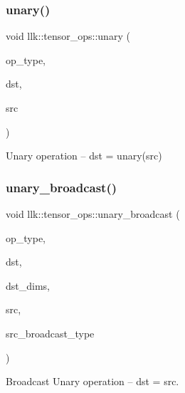 \subsubsection{\texorpdfstring{unary()}{unary()}}
{\footnotesize\ttfamily void llk\+::tensor\+\_\+ops\+::unary (\begin{DoxyParamCaption}\item[{\hyperlink{namespacellk_1_1tensor__ops_a5fae70cbcf6cd7aadca4a04278614633}{unary\+\_\+op}}]{op\+\_\+type,  }\item[{\hyperlink{classllk_1_1Tensor}{llk\+::\+Tensor} \&}]{dst,  }\item[{\hyperlink{classllk_1_1Tensor}{llk\+::\+Tensor} \&}]{src }\end{DoxyParamCaption})}



Unary operation -- dst = unary(src) 

\mbox{\label{namespacellk_1_1tensor__ops_a4430dd9c877f3b6fef3fd296131db096}} 
\subsubsection{\texorpdfstring{unary\+\_\+broadcast()}{unary\_broadcast()}}
{\footnotesize\ttfamily void llk\+::tensor\+\_\+ops\+::unary\+\_\+broadcast (\begin{DoxyParamCaption}\item[{\hyperlink{namespacellk_1_1tensor__ops_a5fae70cbcf6cd7aadca4a04278614633}{unary\+\_\+op}}]{op\+\_\+type,  }\item[{\hyperlink{classllk_1_1Tensor}{llk\+::\+Tensor} \&}]{dst,  }\item[{\hyperlink{structllk_1_1TensorDims}{llk\+::\+Tensor\+Dims}}]{dst\+\_\+dims,  }\item[{\hyperlink{classllk_1_1Tensor}{llk\+::\+Tensor} \&}]{src,  }\item[{\hyperlink{namespacellk_1_1tensor__ops_ac43a7c3eb367c669baaa45a327aeca58}{broadcast\+\_\+op}}]{src\+\_\+broadcast\+\_\+type }\end{DoxyParamCaption})}



Broadcast Unary operation -- dst = src. 

\mbox{\label{namespacellk_1_1tensor__ops_a2aba5bcddb604c8d7fad329330782df4}} 
